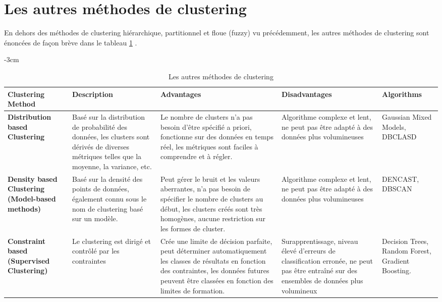 \section{Les autres méthodes de clustering}
En dehors des méthodes de clustering hiérarchique, partitionnel et floue (fuzzy) vu précédemment, les autres méthodes de clustering sont énoncées de façon brève dans le tableau \ref{other_clustering_methods} . 
\begin{table}[H]
	\centering
	\addtolength{\leftskip} {-3cm}
	\addtolength{\rightskip}{-4cm}
	\begin{tabular}{|m{3cm}|m{4cm}|m{4cm}|m{3cm}|m{2cm}|} %
	\hline
	\rowcolor{blueforest}
	\color{white} \textbf{Clustering Method} & \color{white} \textbf{Description} & \color{white} \textbf{Advantages} & \color{white} \textbf{Disadvantages} & \color{white} \textbf{Algorithms}\\
	\hline\hline
	\textbf{Distribution based Clustering}  & Basé sur la distribution de probabilité des données, les clusters sont dérivés de diverses métriques telles que la moyenne, la variance, etc. & Le nombre de clusters n'a pas besoin d'être spécifié a priori, fonctionne sur des données en temps réel, les métriques sont faciles à comprendre et à régler. & Algorithme complexe et lent, ne peut pas être adapté à des données plus volumineuses & Gaussian Mixed Models, DBCLASD\\ \hline
	\textbf{Density based Clustering (Model-based methods)} & Basé sur la densité des points de données, également connu sous le nom de clustering basé sur un modèle. & Peut gérer le bruit et les valeurs aberrantes, n'a pas besoin de spécifier le nombre de clusters au début, les clusters créés sont très homogènes, aucune restriction sur les formes de cluster.  & Algorithme complexe et lent, ne peut pas être adapté à des données plus volumineuses & DENCAST, DBSCAN \\ \hline
	\textbf{Constraint based (Supervised Clustering)} & Le clustering est dirigé et contrôlé par les contraintes & Crée une limite de décision parfaite, peut déterminer automatiquement les classes de résultats en fonction des contraintes, les données futures peuvent être classées en fonction des limites de formation. & Surapprentissage, niveau élevé d'erreurs de classification erronée, ne peut pas être entraîné sur des ensembles de données plus volumineux & Decision Trees, Random Forest, Gradient Boosting. \\ \hline
	\end{tabular}
	\caption{Les autres méthodes de clustering}
	\label{other_clustering_methods}
\end{table}

